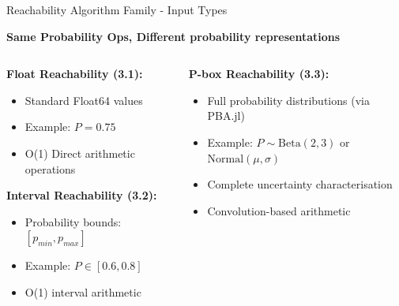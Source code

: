 \documentclass[aspectratio=169]{beamer}
\begin{document}
\begin{frame}{\textcolor{juliapurple}{ Reachability Algorithm Family - Input Types}}
\begin{center}
\textbf{\textcolor{juliapurple}{Same Probability Ops, Different probability representations}}


\end{center}
\begin{columns}
\begin{column}{0.45\textwidth}
\textbf{\textcolor{juliagreen}{Float Reachability (3.1):}}
\begin{itemize}
    \item Standard Float64 values
    \item Example: $P = 0.75$
    \item O(1) Direct arithmetic operations
\end{itemize}

\vspace{0.4cm}
\textbf{\textcolor{juliablue}{Interval Reachability (3.2):}}
\begin{itemize}
    \item Probability bounds: $[p_{min}, p_{max}]$
    \item Example: $P \in [0.6, 0.8]$
    \item O(1) interval arithmetic
\end{itemize}
\end{column}

\begin{column}{0.45\textwidth}
\textbf{\textcolor{juliared}{P-box Reachability (3.3):}}
\begin{itemize}
    \item Full probability distributions (via PBA.jl)
    \item Example: $P \sim \text{Beta}(2,3)$ or $\text{Normal}(\mu, \sigma)$
    \item Complete uncertainty characterisation
    \item Convolution-based arithmetic
\end{itemize}


\end{column}
\end{columns}
\end{frame}
\end{document}
